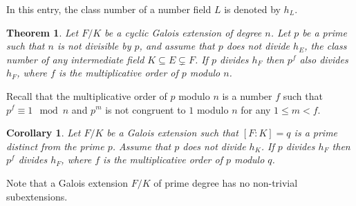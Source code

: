 \documentclass[12pt]{article}
\newtheorem{thm}{Theorem}
\newtheorem{cor}{Corollary}
\begin{document}
In this entry, the class number of a number field $L$ is denoted by $h_L$.

\begin{thm}
Let $F/K$ be a cyclic Galois extension of degree $n$. Let $p$ be a prime such that $n$ is not divisible by $p$, and assume that $p$ does not divide $h_E$, the class number of any intermediate field $K\subseteq E \subsetneq F$. If $p$ divides $h_F$ then $p^f$ also divides $h_F$, where $f$ is the multiplicative order of $p$ modulo $n$.
\end{thm}

Recall that the multiplicative order of $p$ modulo $n$ is a number $f$ such that $p^f\equiv 1 \mod n$ and $p^m$ is not congruent to $1$ modulo $n$ for any $1\leq m <f$.

\begin{cor}
Let $F/K$ be a Galois extension such that $[F:K]=q$ is a prime distinct from the prime $p$. Assume that $p$ does not divide $h_K$. If $p$ divides $h_F$ then $p^f$ divides $h_F$, where $f$ is the multiplicative order of $p$ modulo $q$.
\end{cor}

Note that a Galois extension $F/K$ of prime degree has no non-trivial subextensions.
\end{document}
